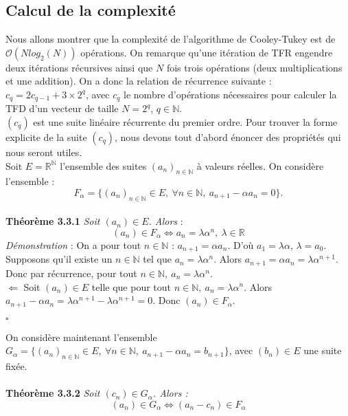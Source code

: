 \documentclass[12pt]{article}
\begin{document}
\subsection{Calcul de la complexité}
Nous allons montrer que la complexité de l'algorithme de Cooley-Tukey est de $\mathcal{O}(Nlog_2(N))$ opérations. On remarque qu'une itération de TFR engendre deux itérations récursives ainsi que $N$ fois trois opérations (deux multiplications et une addition). On a donc la relation de récurrence suivante : $c_q=2c_{q-1}+3\times 2^q$, avec $c_q$ le nombre d'opérations nécessaires pour calculer la TFD d'un vecteur de taille $N=2^q$, $q\in\mathbb{N}$.\\ $(c_q)$ est une suite linéaire récurrente du premier ordre. Pour trouver la forme explicite de la suite $(c_q)$, nous devons tout d'abord énoncer des propriétés qui nous seront utiles.\\
Soit $E=\mathbb{R}^{\mathbb{N}}$ l'ensemble des suites $(a_n)_{n\in\mathbb{N}}$ à valeurs réelles. On considère l'ensemble :\\ \begin{equation*}
F_\alpha=\{(a_n)_{n\in\mathbb{N}}\in E,~\forall n\in\mathbb{N},~a_{n+1}-\alpha a_n=0\}.
\end{equation*}\\
\textbf{Théorème 3.3.1} \textit{Soit $(a_n)\in E$. Alors }:\begin{equation}
(a_n)\in F_\alpha\Leftrightarrow a_n=\lambda\alpha^n,~\lambda\in\mathbb{R}
\end{equation}
\textit{Démonstration} : On a pour tout $n\in\mathbb{N}$ : $a_{n+1}=\alpha a_n$. D'où $a_1=\lambda\alpha$, $\lambda=a_0$. Supposons qu'il existe un $n\in\mathbb{N}$ tel que $a_n=\lambda\alpha^n$. Alors $a_{n+1}=\alpha a_n=\lambda\alpha^{n+1}$. Donc par récurrence, pour tout $n\in\mathbb{N},~a_n=\lambda\alpha^n$.\\
$\Leftarrow$ Soit $(a_n)\in E$ telle que pour tout $n\in\mathbb{N},~a_n=\lambda\alpha^n$. Alors $a_{n+1}-\alpha a_n=\lambda\alpha^{n+1}-\lambda\alpha^{n+1}=0$. Donc $(a_n)\in F_\alpha$.
\begin{flushright} $\square$ \end{flushright}
On considère maintenant l'ensemble $G_\alpha=\{(a_n)_{n\in\mathbb{N}}\in E,~\forall n\in\mathbb{N},~a_{n+1}-\alpha a_n=b_{n+1}\}$, avec $(b_n)\in E$ une suite fixée.\\\\
\textbf{Théorème 3.3.2} \textit{Soit $(c_n)\in G_\alpha$. Alors : }\begin{equation}
(a_n)\in G_\alpha\Leftrightarrow(a_n-c_n)\in F_\alpha
\end{equation}
\end{document}
